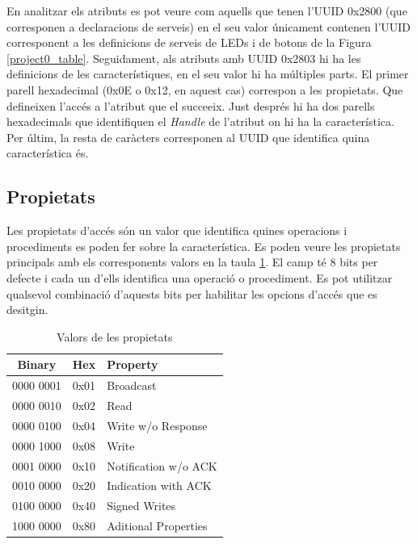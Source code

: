 En analitzar els atributs es pot veure com aquells que tenen l'UUID 0x2800 (que corresponen a declaracions de serveis) en el seu valor únicament contenen l'UUID corresponent a les definicions de serveis de LEDs i de botons de la Figura \ref{project0_table}.
Seguidament, als atributs amb UUID 0x2803 hi ha les definicions de les característiques, en el seu valor hi ha múltiples parts.
El primer parell hexadecimal (0x0E o 0x12, en aquest cas) correspon a les propietats.
Que defineixen l'accés a l'atribut que el succeeix.
Just després hi ha dos parells hexadecimals que identifiquen el \textit{Handle} de l'atribut on hi ha la característica.
Per últim, la resta de caràcters corresponen al UUID que identifica quina característica és.

\subsection{Propietats}
\label{sec:properties}
Les propietats d'accés són un valor que identifica quines operacions i procediments es poden fer sobre la característica.
Es poden veure les propietats principals amb els corresponents valors en la taula \ref{properties}.
El camp té 8 bits per defecte i cada un d'ells identifica una operació o procediment.
Es pot utilitzar qualsevol combinació d'aquests bits  per habilitar les opcions d'accés que es desitgin.

\begin{table}[h]
	\begin{center}
		\begin{tabular}{|c|c|l|}
			\hline
			Binary	&	Hex		&	Property	\\	\hline
			0000 0001	&	0x01	&	Broadcast\\	\hline
			0000 0010	&	0x02	&	Read	\\	\hline
			0000 0100	&	0x04	&	Write w/o Response	\\	\hline
			0000 1000	&	0x08	&	Write	\\	\hline
			0001 0000	&	0x10	&	Notification w/o ACK	\\	\hline
			0010 0000	&	0x20	&	Indication with ACK	\\	\hline
			0100 0000	&	0x40	&	Signed Writes	\\	\hline
			1000 0000	&	0x80	&	Aditional Properties	\\	\hline
		\end{tabular}		
	\end{center}
\caption{Valors de les propietats}
\label{properties}
\end{table}

